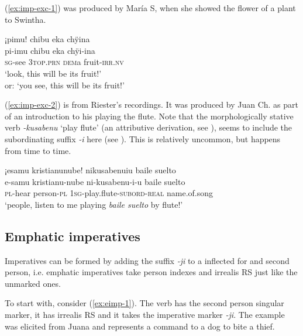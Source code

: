 (\ref{ex:imp-exc-1}) was produced by María S, when she showed the flower of a plant to Swintha.

\ea\label{ex:imp-exc-1}
\begingl
\glpreamble ¡pimu! chibu eka chÿina\\
\gla pi-imu chibu eka chÿi-ina\\
\textsc{sg}-see 3\textsc{top.prn} \textsc{dem}a fruit-\textsc{irr.nv}\\
\glft ‘look, this will be its fruit!’\\or: ‘you see, this will be its fruit!’
\endgl
\trailingcitation{[rxx-e121126s-3.17-18]}
\xe

(\ref{ex:imp-exc-2}) is from Riester’s recordings. It was produced by Juan Ch. as part of an introduction to his playing the flute. Note that the morphologically stative verb \textit{-kusabenu} ‘play flute’ (an attributive derivation, see ), seems to include the subordinating suffix \textit{-i} here (see ). This is relatively uncommon, but happens from time to time.

\ea\label{ex:imp-exc-2}
\begingl
\glpreamble ¡esamu kristianunube! nikusabenuiu baile suelto\\
\gla e-samu kristianu-nube ni-kusabenu-i-u {baile suelto}\\
\textsc{pl}-hear person-\textsc{pl} 1\textsc{sg}-play.flute-\textsc{subord}-\textsc{real} {name.of.song}\\
\glft ‘people, listen to me playing \textit{baile suelto} by flute!’
\endgl
\trailingcitation{[nxx-a630101g-2.002-003]}
\xe



\subsection{Emphatic imperatives}\label{sec:MarkedImperatives}

Imperatives can be formed by adding the suffix \textit{-ji} to a  inflected for  and second person, i.e. emphatic imperatives take person indexes and irrealis RS just like the unmarked ones.

To start with, consider (\ref{ex:eimp-1}). The verb has the second person singular marker, it has irrealis RS and it takes the imperative marker \textit{-ji}. The example was elicited from Juana and represents a command to a dog to bite a thief.

